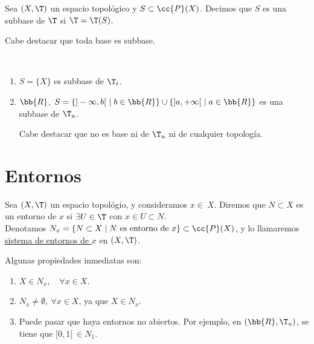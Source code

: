 \begin{definicion}
    Sea $(X,\T)$ un espacio topológico y $S\subset \cc{P}(X)$. Decimos que $S$ es una subbase de $\T$ si $\T=\T(S)$.
\end{definicion}

Cabe destacar que toda base es subbase.

\begin{ejemplo}\
\begin{enumerate}
    \item $S=\{X\}$ es subbase de $\T_t$.
    \item $\bb{R}$, $S=\{]-\infty, b[~\mid b\in \bb{R}\} \cup \{]a,+\infty[~\mid a\in \bb{R}\}$ es una subbase de $\T_u$.

    Cabe destacar que no es base ni de $\T_u$ ni de cualquier topología.
\end{enumerate}
\end{ejemplo}

\section{Entornos}
\begin{definicion}[Entornos]
    Sea $(X,\T)$ un espacio topológio, y consideramos $x\in~X$. Diremos que $N\subset X$ es un entorno de $x$ si $\exists U\in \T$ con $x\in U\subset N$.\\

    Denotamos $N_x = \{N\subset X\mid N \text{ es entorno de $x$}\}\subset \cc{P}(X)$, y lo llamaremos \ul{sistema de entornos de $x$} en $(X,\T)$.
\end{definicion}

Algunas propiedades inmediatas son:
\begin{enumerate}
    \item $X\in N_x,\quad \forall x\in X$.
    \item $N_x\neq \emptyset,~\forall x\in X$, ya que $X\in N_x$.
    \item Puede pasar que haya entornos no abiertos. Por ejemplo, en $(\bb{R}, \T_u)$, se tiene que $[0,1[~\in N_1$.
\end{enumerate}

